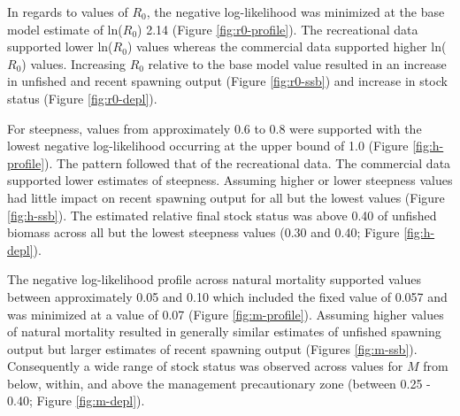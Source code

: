 \documentclass[11pt,
  english,
  a4paper,
]{article}
\begin{document}
\leavevmode\tagmcend\tagstructend\par


In regards to values of {\(R_0\)\leavevmode\tagmcend\tagstructend}, the negative log-likelihood was minimized at the base model estimate of ln({\(R_0\)\leavevmode\tagmcend\tagstructend}) 2.14 (Figure \ref{fig:r0-profile}). The recreational data supported lower ln({\(R_0\)\leavevmode\tagmcend\tagstructend}) values whereas the commercial data supported higher ln({\(R_0\)\leavevmode\tagmcend\tagstructend}) values. Increasing {\(R_0\)\leavevmode\tagmcend\tagstructend} relative to the base model value resulted in an increase in unfished and recent spawning output (Figure \ref{fig:r0-ssb}) and increase in stock status (Figure \ref{fig:r0-depl}).

\leavevmode\tagmcend\tagstructend\par


For steepness, values from approximately 0.6 to 0.8 were supported with the lowest negative log-likelihood occurring at the upper bound of 1.0 (Figure \ref{fig:h-profile}). The pattern followed that of the recreational data. The commercial data supported lower estimates of steepness. Assuming higher or lower steepness values had little impact on recent spawning output for all but the lowest values (Figure \ref{fig:h-ssb}). The estimated relative final stock status was above 0.40 of unfished biomass across all but the lowest steepness values (0.30 and 0.40; Figure \ref{fig:h-depl}).

\leavevmode\tagmcend\tagstructend\par


The negative log-likelihood profile across natural mortality supported values between approximately 0.05 and 0.10 which included the fixed value of 0.057 and was minimized at a value of 0.07 (Figure \ref{fig:m-profile}). Assuming higher values of natural mortality resulted in generally similar estimates of unfished spawning output but larger estimates of recent spawning output (Figures \ref{fig:m-ssb}). Consequently a wide range of stock status was observed across values for {\(M\)\leavevmode\tagmcend\tagstructend} from below, within, and above the management precautionary zone (between 0.25 - 0.40; Figure \ref{fig:m-depl}).
\end{document}
